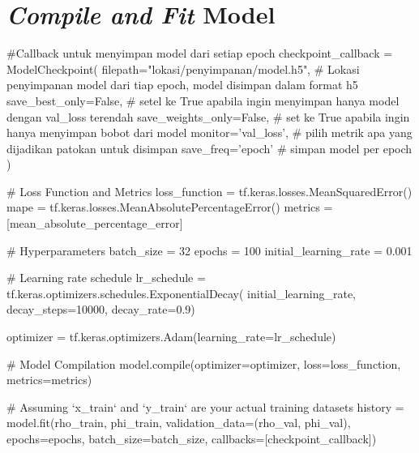 \section{\textit{Compile and Fit} Model}\label{training model}
\begin{lampiranpythoncode}
#Callback untuk menyimpan model dari setiap epoch
checkpoint_callback = ModelCheckpoint(
    filepath="lokasi/penyimpanan/model.h5",  # Lokasi penyimpanan model dari tiap epoch, model disimpan dalam format h5
    save_best_only=False,  # setel ke True apabila ingin menyimpan hanya model dengan val_loss terendah
    save_weights_only=False,  # set ke True apabila ingin hanya menyimpan bobot dari model
    monitor='val_loss',  # pilih metrik apa yang dijadikan patokan untuk disimpan
    save_freq='epoch'  # simpan model per epoch
)

# Loss Function and Metrics
loss_function = tf.keras.losses.MeanSquaredError()
mape = tf.keras.losses.MeanAbsolutePercentageError()
metrics = [mean_absolute_percentage_error]

# Hyperparameters
batch_size = 32
epochs = 100
initial_learning_rate = 0.001

# Learning rate schedule
lr_schedule = tf.keras.optimizers.schedules.ExponentialDecay(
    initial_learning_rate,
    decay_steps=10000,
    decay_rate=0.9)

optimizer = tf.keras.optimizers.Adam(learning_rate=lr_schedule)

# Model Compilation
model.compile(optimizer=optimizer, loss=loss_function, metrics=metrics)

# Assuming `x_train` and `y_train` are your actual training datasets
history = model.fit(rho_train, phi_train, validation_data=(rho_val, phi_val), epochs=epochs, batch_size=batch_size, callbacks=[checkpoint_callback])
\end{lampiranpythoncode}



